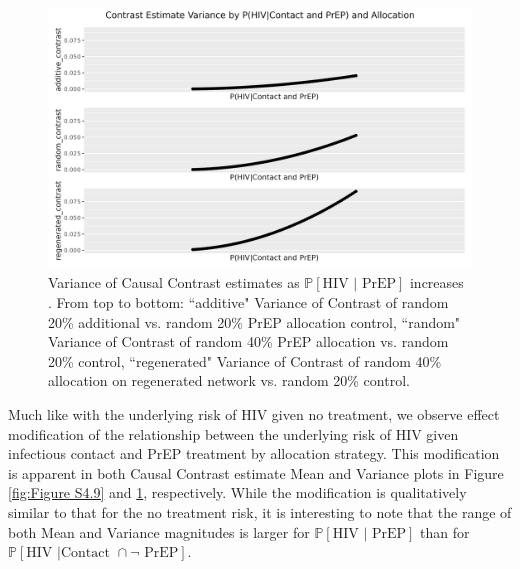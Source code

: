 \documentclass{article}
\theoremstyle{definition}
\begin{document}
\begin{figure}[H]
    \centering
    \includegraphics[width=\linewidth]{Corrected Figures/p2 Variance plots.png}
    \caption{Variance of Causal Contrast estimates as $\mathbb{P}\left[\text{HIV } \vert \text{ PrEP}\right]$ increases .  From top to bottom: ``additive" Variance of Contrast of random 20\% additional vs. random 20\% PrEP allocation control, ``random" Variance of Contrast of random 40\% PrEP allocation vs. random 20\% control, ``regenerated" Variance of Contrast of random 40\% allocation on regenerated network vs. random 20\% control.}
    \label{fig:Figure S4.10}
\end{figure}
Much like with the underlying risk of HIV given no treatment, we observe effect modification of the relationship between the underlying risk of HIV given infectious contact and PrEP treatment by allocation strategy. This modification is apparent in both Causal Contrast estimate Mean and Variance plots in Figure \ref{fig:Figure S4.9} and \ref{fig:Figure S4.10}, respectively. While the modification is qualitatively similar to that for the no treatment risk, it is interesting to note that the range of both Mean and Variance magnitudes is larger for $\mathbb{P}\left[\text{HIV } \vert \text{ PrEP}\right]$ than for $\mathbb{P}\left[\text{HIV } \vert \text {Contact } \cap \neg \text{ PrEP}\right]$.
\end{document}
